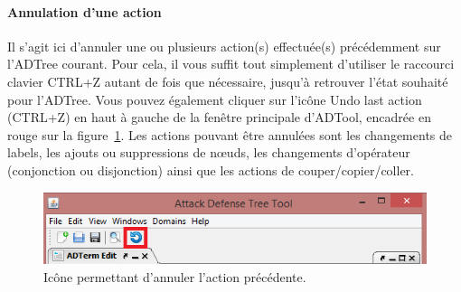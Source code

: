 \paragraph{Annulation d'une action} Il s'agit ici d'annuler une ou plusieurs action(s) effectuée(s) précédemment sur l'ADTree courant. Pour cela, il vous suffit tout simplement d'utiliser le raccourci clavier {\sc CTRL+Z} autant de fois que nécessaire, jusqu'à retrouver l'état souhaité pour l'ADTree. Vous pouvez également cliquer sur l'icône \og Undo last action (CTRL+Z) \fg{} en haut à gauche de la fenêtre principale d'ADTool, encadrée en rouge sur la {\sc figure}~\ref{fig:undo}. Les actions pouvant être annulées sont les changements de labels, les ajouts ou suppressions de n\oe{}uds, les changements d'opérateur (conjonction ou disjonction) ainsi que les actions de couper/copier/coller.

\begin{figure}[H]
        \centering
        \includegraphics[height=0.17\textwidth]{figure/undo.png}
        \caption{Icône permettant d'annuler l'action précédente.}
        \label{fig:undo}
    \end{figure}